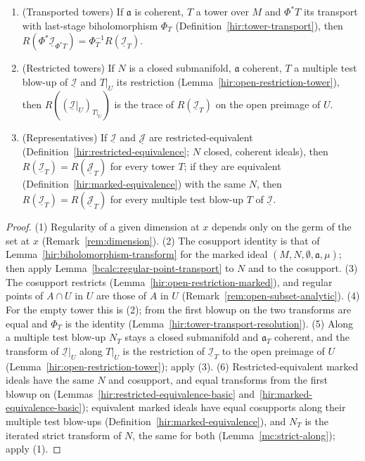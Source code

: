 \begin{proposition}
\begin{enumerate}
\item (Transported towers) If \(\mathfrak a\) is coherent, \(T\) a tower over \(M\) and \(\Phi^*T\) its transport with last-stage biholomorphism \(\Phi_T\)
(Definition~\ref{hir:tower-transport}), then \(R(\Phi^*\underline{\mathcal I}_{\Phi^*T})=\Phi_T^{-1}R(\underline{\mathcal I}_T)\).
\item (Restricted towers) If \(N\) is a closed submanifold, \(\mathfrak a\) coherent, \(T\) a multiple test blow-up of \(\underline{\mathcal I}\) and \(T|_U\) its restriction
(Lemma~\ref{hir:open-restriction-tower}), then \(R((\underline{\mathcal I}|_U)_{T|_U})\) is the trace of \(R(\underline{\mathcal I}_T)\) on the open preimage of \(U\).
\item (Representatives) If \(\underline{\mathcal I}\) and \(\underline{\mathcal J}\) are restricted-equivalent (Definition~\ref{hir:restricted-equivalence}; \(N\) closed, coherent
ideals), then \(R(\underline{\mathcal I}_T)=R(\underline{\mathcal J}_T)\) for every tower \(T\); if they are equivalent (Definition~\ref{hir:marked-equivalence}) with the same \(N\),
then \(R(\underline{\mathcal I}_T)=R(\underline{\mathcal J}_T)\) for every multiple test blow-up \(T\) of \(\underline{\mathcal I}\).
\end{enumerate}
\end{proposition}
\begin{proof}
\leanok
(1) Regularity of a given dimension at \(x\) depends only on the germ of the set at \(x\) (Remark~\ref{rem:dimension}). (2) The cosupport identity is that of
Lemma~\ref{hir:biholomorphism-transform} for the marked ideal \((M,N,\emptyset,\mathfrak a,\mu)\); then apply Lemma~\ref{bcalc:regular-point-transport} to \(N\) and to the
cosupport. (3) The cosupport restricts (Lemma~\ref{hir:open-restriction-marked}), and regular points of \(A\cap U\) in \(U\) are those of \(A\) in \(U\)
(Remark~\ref{rem:open-subset-analytic}). (4) For the empty tower this is (2); from the first blowup on the two transforms are equal and \(\Phi_T\) is the identity
(Lemma~\ref{hir:tower-transport-resolution}). (5) Along a multiple test blow-up \(N_T\) stays a closed submanifold and \(\mathfrak a_T\) coherent, and the transform of
\(\underline{\mathcal I}|_U\) along \(T|_U\) is the restriction of \(\underline{\mathcal I}_T\) to the open preimage of \(U\) (Lemma~\ref{hir:open-restriction-tower}); apply (3).
(6) Restricted-equivalent marked ideals have the same \(N\) and cosupport, and equal transforms from the first blowup on
(Lemmas~\ref{hir:restricted-equivalence-basic} and~\ref{hir:marked-equivalence-basic}); equivalent marked ideals have equal cosupports along their multiple test
blow-ups (Definition~\ref{hir:marked-equivalence}), and \(N_T\) is the iterated strict transform of \(N\), the same for both (Lemma~\ref{mc:strict-along}); apply (1).
\end{proof}